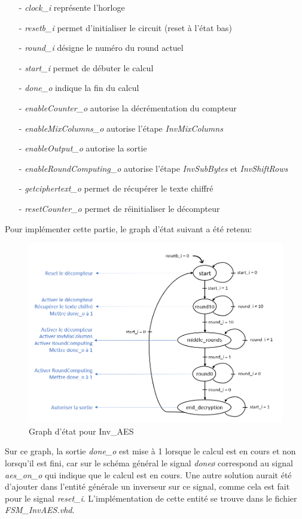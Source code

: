\documentclass[a4paper, 12pt]{article}
\begin{document}
			\begin{itemize}
				\item[-] \emph{clock\_i} représente l'horloge
				\item[-] \emph{resetb\_i} permet d'initialiser le circuit (reset à l'état bas)
				\item[-] \emph{round\_i} désigne le numéro du round actuel
				\item[-] \emph{start\_i} permet de débuter le calcul
				\item[-] \emph{done\_o} indique la fin du calcul
				\item[-] \emph{enableCounter\_o} autorise la décrémentation du compteur
				\item[-] \emph{enableMixColumns\_o} autorise l'étape \emph{InvMixColumns}
				\item[-] \emph{enableOutput\_o} autorise la sortie
				\item[-] \emph{enableRoundComputing\_o} autorise l'étape \emph{InvSubBytes} et \emph{InvShiftRows}
				\item[-] \emph{getciphertext\_o} permet de récupérer le texte chiffré
				\item[-] \emph{resetCounter\_o} permet de réinitialiser le décompteur	\\
			\end{itemize} 
\par Pour implémenter cette partie, le graph d'état suivant a été retenu:
			\begin{figure}[H]
				\begin{center}
				\includegraphics[scale=0.6]{Images/FSMInvAES.png}
				\end{center}
				\caption{Graph d'état pour Inv\_AES}
				\label{FSMInvAES}
			\end{figure}
	Sur ce graph, la sortie \emph{done\_o} est mise à 1 lorsque le calcul est en cours et non lorsqu'il est fini, car sur le schéma général le signal \emph{done\o} correspond au signal \emph{aes\_on\_o} qui indique que le calcul est en cours. Une autre solution aurait été d'ajouter dans l'entité générale un inverseur sur ce signal, comme cela est fait pour le signal \emph{reset\_i}.
		L'implémentation de cette entité se trouve dans le fichier \emph{FSM\_InvAES.vhd}.
\end{document}
